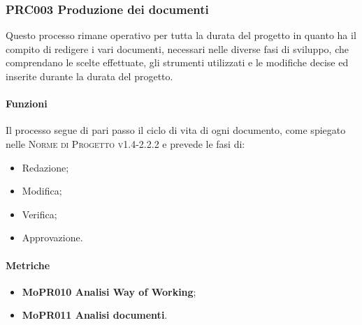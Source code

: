 \documentclass[../piano-di-qualifica.tex]{subfiles}
\begin{document}
\subsubsection{PRC003 Produzione dei documenti}
\label{sub:produzione_dei_documenti}
Questo processo rimane operativo per tutta la durata del progetto in quanto ha il compito di redigere i vari documenti, necessari nelle diverse fasi di sviluppo, che comprendano le scelte effettuate, gli strumenti utilizzati e le modifiche decise ed inserite durante la durata del progetto.

\paragraph{Funzioni}
\label{sub:funzioni_3}
Il processo segue di pari passo il ciclo di vita di ogni documento, come spiegato nelle \textsc{Norme di Progetto v1.4-2.2.2} e prevede le fasi di:
\begin{itemize}
    \item Redazione;
    \item Modifica;
    \item Verifica;
    \item Approvazione.        
\end{itemize}

\paragraph{Metriche}
\label{sub:metriche_3}
\begin{itemize}
    \item \textbf{MoPR010 Analisi Way of Working};
    \item \textbf{MoPR011 Analisi documenti}.
\end{itemize}
\end{document}
